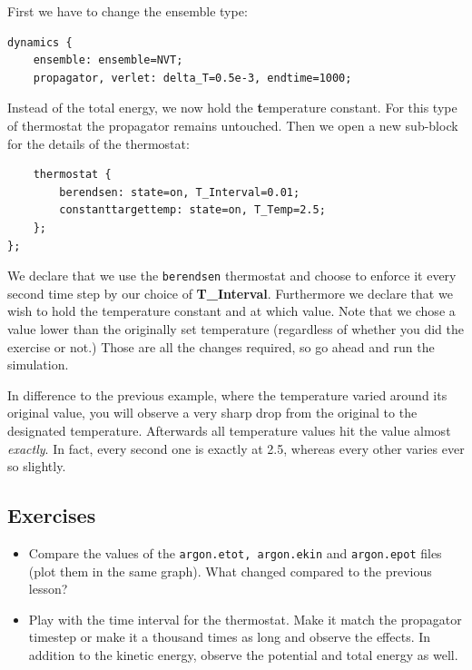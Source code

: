 First we have to change the ensemble type:
\begin{lstlisting}
dynamics {
    ensemble: ensemble=NVT;
    propagator, verlet: delta_T=0.5e-3, endtime=1000;
\end{lstlisting}
Instead of the total energy, we now hold the \textbf{t}emperature constant. For this type of thermostat the propagator remains untouched.
Then we open a new sub-block for the details of the thermostat:
\begin{lstlisting}
    thermostat {
        berendsen: state=on, T_Interval=0.01;
        constanttargettemp: state=on, T_Temp=2.5;
    };
};
\end{lstlisting}
We declare that we use the \texttt{berendsen} thermostat and choose to enforce it every second time step by our choice of \textbf{T\_Interval}.
Furthermore we declare that we wish to hold the temperature constant and at which value. Note that we chose a value lower than
the originally set temperature (regardless of whether you did the exercise or not.)
Those are all the changes required, so go ahead and run the simulation.

In difference to the previous example, where the temperature varied around its original value, you will observe a very sharp drop
from the original to the designated temperature. Afterwards all temperature values hit the value almost \textit{exactly}. In
fact, every second one is exactly at 2.5, whereas every other varies ever so slightly.

\subsection{Exercises}
\begin{itemize}
\item Compare the values of the \texttt{argon.etot, argon.ekin} and \texttt{argon.epot} files (plot them in the same graph). What changed compared to the previous lesson?
\item Play with the time interval for the thermostat. Make it match the propagator timestep or make it a thousand times as long and observe the effects. In addition to the kinetic energy, observe the potential and total energy as well.
\end{itemize}

